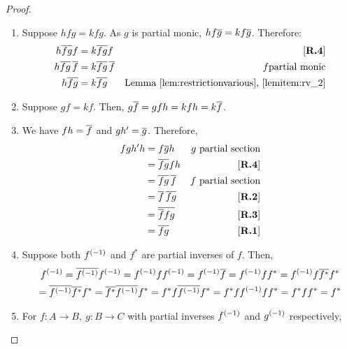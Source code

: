 \begin{proof}
  \prepprooflist
  \begin{enumerate}[{(}i{)}]
    \item Suppose $h f g = k f g$. As $g$ is partial monic, $h f \overline{g} = k f \overline{g}$.
      Therefore:
      \begin{align*}
        h \overline{f g} f &= k \overline{f g} f &[\text{\bfseries {R}.{4}}]\\
        h \overline{f g}\,\overline{f} &= k \overline{f g}\, \overline{f} & f\text{partial monic}\\
        h \overline{fg}&= k \overline{fg} & \text{Lemma \ref{lem:restrictionvarious},
          \ref{lemitem:rv_2}}
      \end{align*}
    \item Suppose $g f = k f$. Then, $g\overline{f} = g f h = k f h = k \overline{f}$.
    \item We have $f h = \overline{f}$ and $g h' = \overline{g}$. Therefore,
      \begin{align*}
        f g h' h &= f \overline{g} h & g \text{ partial section}\\
        &= \overline{f g} f h & [\text{\bfseries {R}.{4}}]\\
        &= \overline{f g}\, \overline{f} & f \text{ partial section}\\
        &= \overline{f}\, \overline{f g} & [\text{\bfseries {R}.{2}}]\\
        &= \overline{\overline{f}f g} & [\text{\bfseries {R}.{3}}]\\
        &= \overline{f g} & [\text{\bfseries {R}.{1}}]
      \end{align*}
    \item Suppose both ${f}^{(-1)}$ and $f^*$ are partial inverses of $f$. Then,
      \begin{multline*}
        \inv{f}
        = \restr{\inv{f}}\inv{f} %
        =\inv{f}f\inv{f}  %
        = \inv{f} \restr{f}   %
        = \inv{f} f f^*   %
        = \inv{f} f \restr{f^*} f^*  \\ %
        = \restr{\inv{f}}\restr{f^*} f^*   %
        = \restr{f^*}\restr{\inv{f}} f^* %
        = f^* f \restr{\inv{f}}  f^* %
        = f^* f \inv{f} f f^* %
        = f^* f f^* %
        = f^* %
      \end{multline*}
    \item For $f:A\to B,\ g:B\to C$ with partial inverses ${f}^{(-1)}$ and ${g}^{(-1)}$ respectively,

\end{enumerate}
\end{proof}
